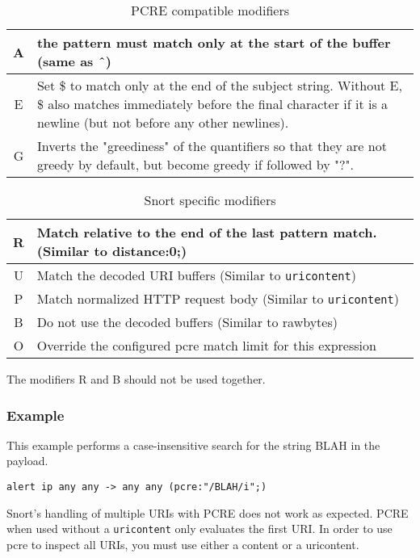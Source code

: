 \documentclass[english]{report}
\newenvironment{note}{
\samepage
    \vspace{10pt}{\textsf{
        {\hspace{7pt}\Huge{$\triangle$\hspace{-12.5pt}{\Large{$^!$}}}}\hspace{5pt}
        {\Large{NOTE}}
    }
    }
   \begin{center}
    \par\vspace{-17pt}

    \begin{lrbox}{\savepar}
    \begin{minipage}[r]{6in}
}
{
    \end{minipage}
    \end{lrbox}
    \fbox{
        \usebox{
            \savepar
	}
    }
    \par\vskip10pt
    \end{center}
}
\begin{document}
\begin{longtable}{|c|p{3.5in}|}
\caption{PCRE compatible modifiers} \\
\hline
A & the pattern must match only at the start of the buffer (same as \^\ ) \\
\hline
E & Set \$ to match only at the end of the subject string.  Without E, \$ also matches immediately before the final character if it is a newline (but not before any other newlines). \\
\hline
G & Inverts the "greediness" of the quantifiers so that they are not greedy by default, but become greedy if followed by "?". \\
\hline
\end{longtable}

\begin{longtable}{|c|p{3.5in}|}
\caption{Snort specific modifiers} \\
\hline
R & Match relative to the end of the last pattern match.  (Similar to distance:0;) \\
\hline
U & Match the decoded URI buffers (Similar to \texttt{uricontent}) \\
\hline
P & Match normalized HTTP request body (Similar to \texttt{uricontent}) \\
\hline
B & Do not use the decoded buffers (Similar to rawbytes) \\
\hline
O & Override the configured pcre match limit for this expression \\
\hline
\end{longtable}

The modifiers R and B should not be used together.

\subsubsection{Example}

This example performs a case-insensitive search for the string BLAH in the payload.

\begin{verbatim}
alert ip any any -> any any (pcre:"/BLAH/i";)
\end{verbatim}

\begin{note}
Snort's handling of multiple URIs with PCRE does not work as expected.  PCRE when used without a \texttt{uricontent} only evaluates the first URI.  In order to use pcre to inspect all URIs, you must use either a content or a uricontent.
\end{note}
\end{document}
